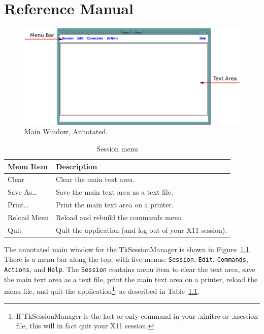 \chapter{Reference Manual}
\label{chpt:ReferenceManual}

\begin{figure}[hbpt]
\begin{centering}
\includegraphics[width=5in]{MainWindowAnnotated.png}
\caption{Main Window, Annotated.}
\label{ref:fig:mainwindow}
\end{centering}
\end{figure}
\begin{table}[hbpt]
\begin{centering}
\begin{tabular}{|l|p{3in}|}
\hline
Menu Item & Description \\
\hline
\hline
Clear & Clear the main text area. \\
\hline
Save As\ldots & Save the main text area as a text file. \\
\hline
Print\ldots & Print the main text area on a printer. \\
\hline
Reload Menu & Reload and rebuild the commands menu. \\
\hline
Quit & Quit the application (and log out of your X11  session). \\
\hline
\end{tabular}
\caption{Session menu}
\label{ref:tab:sessionmenu}
\end{centering}
\end{table}
The annotated main window for the TkSessionManager is shown in
Figure~\ref{ref:fig:mainwindow}.  There is a menu bar along the top,
with five menus: \texttt{Session}, \texttt{Edit}, \texttt{Commands}, 
\texttt{Actions}, and \texttt{Help}.  The \texttt{Session} contains menu
item to clear the text area, save the main text area as a text file,
print the main text area on a printer, reload the menu file, and quit
the application\footnote{If TkSessionManager is the last or only command
in your .xinitrc or .xsession file, this will in fact quit your X11
session.}, as described in Table~\ref{ref:tab:sessionmenu}.


